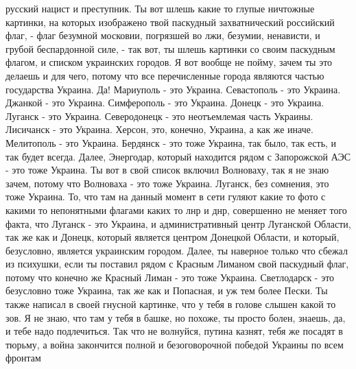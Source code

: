  
 
 
 
 

русский нацист и преступник. Ты вот шлешь какие то глупые ничтожные картинки,
на которых изображено твой паскудный захватнический российский флаг, - флаг
безумной московии, погрязшей во лжи, безумии, ненависти, и грубой беспардонной
силе, - так вот, ты шлешь картинки со своим паскудным флагом, и списком
украинских городов. Я вот вообще не пойму, зачем ты это делаешь и для чего,
потому что все перечисленные города являются частью государства Украина.  Да!
Мариуполь - это Украина. Севастополь - это Украина. Джанкой - это Украина.
Симферополь - это Украина.  Донецк - это Украина. Луганск - это Украина.
Северодонецк - это неотъемлемая часть Украины.  Лисичанск - это Украина.
Херсон, это, конечно, Украина, а как же иначе. Мелитополь - это Украина.
Бердянск - это тоже Украина, так было, так есть, и так будет всегда. Далее,
Энергодар, который находится рядом с Запорожской АЭС - это тоже Украина. Ты вот
в свой список включил Волноваху, так я не знаю зачем, потому что Волноваха -
это тоже Украина. Луганск, без сомнения, это тоже Украина. То, что там на
данный момент в сети гуляют какие то фото с какими то непонятными флагами каких
то лнр и днр, совершенно не меняет того факта, что Луганск - это Украина, и
административный центр Луганской Области, так же как и Донецк, который является
центром Донецкой Области, и который, безусловно, является украинским городом.
Далее, ты наверное только что сбежал из психушки, если ты поставил рядом с
Красным Лиманом свой паскудный флаг, потому что конечно же Красный Лиман - это
тоже Украина. Светлодарск - это безусловно тоже Украина, так же как и Попасная,
и уж тем более Пески. Ты также написал в своей гнусной картинке, что у тебя в
голове слышен какой то зов. Я не знаю, что там у тебя в башке, но похоже, ты
просто болен, знаешь, да, и тебе надо подлечиться. Так что не волнуйся, путина
казнят, тебя же посадят в тюрьму, а война закончится полной и безоговорочной
победой Украины по всем фронтам
